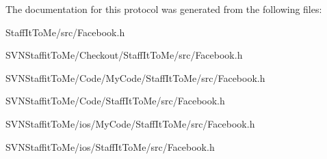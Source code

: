\-The documentation for this protocol was generated from the following files\-:\begin{DoxyCompactItemize}
\item 
\-Staff\-It\-To\-Me/src/\-Facebook.\-h\item 
\-S\-V\-N\-Staffit\-To\-Me/\-Checkout/\-Staff\-It\-To\-Me/src/\-Facebook.\-h\item 
\-S\-V\-N\-Staffit\-To\-Me/\-Code/\-My\-Code/\-Staff\-It\-To\-Me/src/\-Facebook.\-h\item 
\-S\-V\-N\-Staffit\-To\-Me/\-Code/\-Staff\-It\-To\-Me/src/\-Facebook.\-h\item 
\-S\-V\-N\-Staffit\-To\-Me/ios/\-My\-Code/\-Staff\-It\-To\-Me/src/\-Facebook.\-h\item 
\-S\-V\-N\-Staffit\-To\-Me/ios/\-Staff\-It\-To\-Me/src/\-Facebook.\-h\end{DoxyCompactItemize}
